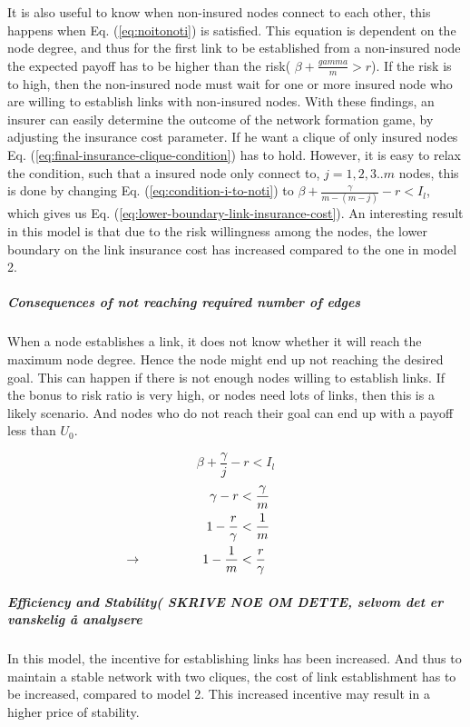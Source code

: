 It is also useful to know when non-insured nodes connect to each other, this happens when Eq. (\ref{eq:noitonoti}) is satisfied. This equation is dependent on the node degree, and thus for the first link to be established from a non-insured node the expected payoff has to be higher than the risk( $\beta+\frac{gamma}{m}>r$). If the risk is to high, then the non-insured node must wait for one or more insured node who are willing to establish links with non-insured nodes.
With these findings, an insurer can easily determine the outcome of the network formation game, by adjusting the
insurance cost parameter. If he want a clique of only insured nodes Eq. (\ref{eq:final-insurance-clique-condition}) has to
hold. However, it is easy to relax the condition, such that a insured node only connect to, $j=1,2,3..m$ nodes,
   this is done by changing Eq. (\ref{eq:condition-i-to-noti}) to $\beta+\frac{\gamma}{m-(m-j)}-r<I_{l}$, which
    gives us Eq. (\ref{eq:lower-boundary-link-insurance-cost}).
An interesting result in this model is that due to the risk willingness among the nodes, the lower boundary on the link insurance cost has increased compared to the one in model 2. 

\subparagraph{Consequences of not reaching required number of edges}
When a node establishes a link, it does not know whether it will reach the maximum node degree. Hence the node might end up not reaching the desired goal. This can happen if there is not enough nodes willing to establish links. If the bonus to risk ratio is very high, or nodes need lots of links, then this is a likely scenario. And nodes who do not reach their goal can end up with a payoff less than $U_{0}$. 

\begin{equation} 
\beta+\frac{\gamma}{j}-r<I_{l}
\label{eq:lower-boundary-link-insurance-cost}
\end{equation} 
\begin{eqnarray}
\gamma-r &<\frac{\gamma}{m}\nonumber \\
1-\frac{r}{\gamma}&<\frac{1}{m} \nonumber \\
\llap{$\rightarrow$\hspace{50pt}}1-\frac{1}{m}&<\frac{r}{\gamma}
\label{eq:noinsuredcliqueconditon}
\end{eqnarray}
\subparagraph{Efficiency and Stability( SKRIVE NOE OM DETTE, selvom det er vanskelig å analysere}
In this model, the incentive for establishing links has been increased. And thus to maintain a stable network with two cliques, the cost of link establishment has to be increased, compared to model 2. This increased incentive may result in a higher price of stability. 
